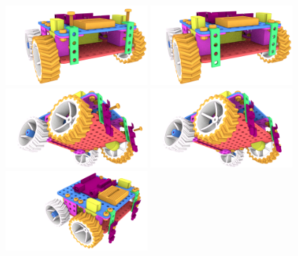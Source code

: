 \documentclass[twoside,a5paper,8pt]{article}
\begin{document}
  \includegraphics[height=30mm]{blender-render/render-instr/24-ir-mount1-dev.png}
  \includegraphics[height=30mm]{blender-render/render-instr/25-ir-mount1.png} \\
  \includegraphics[height=30mm]{blender-render/render-instr/26-ir-mount2-dev-view2.png}
  \includegraphics[height=30mm]{blender-render/render-instr/27-ir-mount2-view2.png} \\
  
    \includegraphics[height=30mm]{blender-render/render-instr/27-ir-mount2-view1.png}
\end{document}
